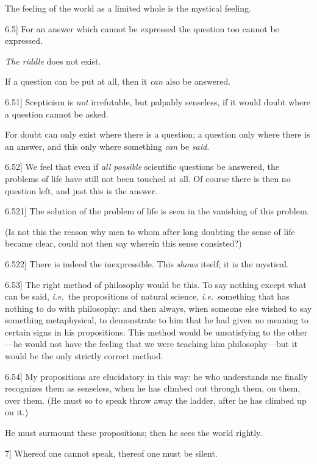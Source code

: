 \documentclass[12pt,oneside]{book}[2007/10/19]
\newcommand{\PropositionE}[2]{%
  \item[\phantomsection\label{PropE:#1}\PropGRef{#1}] #2%
}
\newcommand{\PropGRef}[1]{\hyperref[PropG:#1]{#1}}
\newcommand{\idEst}{\textit{i.e.}}
\begin{document}
\begin{propositions}
{The feeling of the world as a limited whole is
the mystical feeling.}


\PropositionE{6.5}
{For an answer which cannot be expressed the
question too cannot be expressed.

\emph{The riddle} does not exist.

If a question can be put at all, then it \emph{can} also
be answered.}


\PropositionE{6.51}
{Scepticism is \emph{not} irrefutable, but palpably senseless,
if it would doubt where a question cannot be
asked.

For doubt can only exist where there is a
question; a question only where there is an answer,
and this only where something \emph{can} be \emph{said}.}


\PropositionE{6.52}
{We feel that even if \emph{all possible} scientific
questions be answered, the problems of life have
still not been touched at all. Of course there is
then no question left, and just this is the
answer.}


\PropositionE{6.521}
{The solution of the problem of life is seen in the
vanishing of this problem.

(Is not this the reason why men to whom
after long doubting the sense of life became
clear, could not then say wherein this sense
consisted?)}


\PropositionE{6.522}
{There is indeed the inexpressible. This \emph{shows}
itself; it is the mystical.}


\PropositionE{6.53}
{The right method of philosophy would be this.
To say nothing except what can be said, \idEst\ the
propositions of natural science, \idEst\ something that
has nothing to do with philosophy: and then
always, when someone else wished to say something
metaphysical, to demonstrate to him that he
had given no meaning to certain signs in his
propositions. This method would be unsatisfying
to the other---he would not have the feeling that
we were teaching him philosophy---but it would be
the only strictly correct method.}


\PropositionE{6.54}
{My propositions are elucidatory in this way:
he who understands me finally recognizes them as
senseless, when he has climbed out through them,
on them, over them. (He must so to speak throw
away the ladder, after he has climbed up on it.)

He must surmount these propositions; then he
sees the world rightly.}


\PropositionE{7}
{Whereof one cannot speak, thereof one must be
silent.}
\end{propositions}
\end{document}
